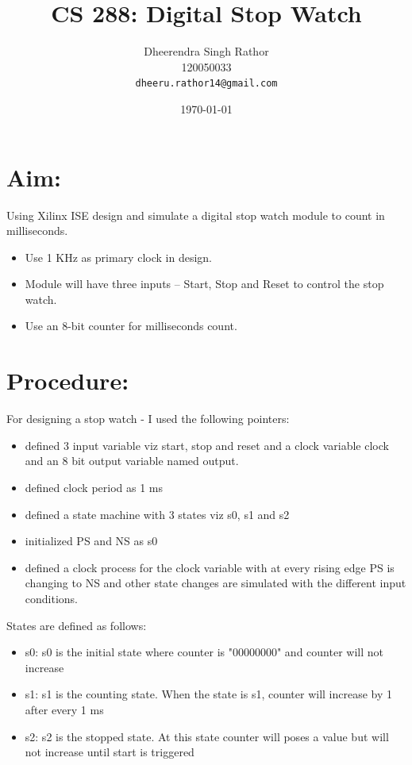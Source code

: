 \documentclass[12pt]{article}
\begin{document}
\title{\vspace{15ex}\Huge{CS 288: Digital Stop Watch}\vspace{15ex}}


\author{
  Dheerendra Singh Rathor\\120050033\\
  \texttt{dheeru.rathor14@gmail.com}\\[1 cm]
}

\date{\today}
\maketitle
\newpage

\section{Aim:}
Using Xilinx ISE design and simulate a digital stop watch module to count in milliseconds.
\begin{itemize}
\item Use 1 KHz as primary clock in design.
\item Module will have three inputs – Start, Stop and Reset to control the stop watch.
\item Use an 8-bit counter for milliseconds count.
\end{itemize}

\section{Procedure:}
For designing a stop watch - I used the following pointers:
\begin{itemize}
\item defined 3 input variable viz start, stop and reset and a clock variable clock and an 8 bit output variable named output.
\item defined clock period as 1 ms
\item defined a state machine with 3 states viz s0, s1 and s2
\item initialized PS and NS as s0
\item defined a clock process for the clock variable with at every rising edge PS is changing to NS and other state changes are simulated with the different input conditions.
\end{itemize}

States are defined as follows:
\begin{itemize}
\item s0: s0 is the initial state where counter is "00000000" and counter will not increase
\item s1: s1 is the counting state. When the state is s1, counter will increase by 1 after every 1 ms
\item s2: s2 is the stopped state. At this state counter will poses a value but will not increase until start is triggered
\end{itemize}
\end{document}
